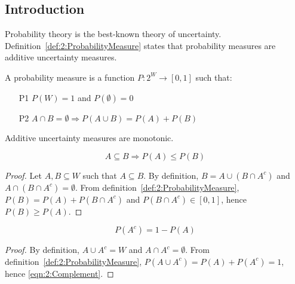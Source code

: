\subsection{Introduction}

Probability theory is the best-known theory of uncertainty.
Definition~\ref{def:2:ProbabilityMeasure} states that probability measures are
additive uncertainty measures.

\begin{dfn}
  \label{def:2:ProbabilityMeasure}

  A probability measure is a function $P : 2^W \to [0, 1]$ such that:
  \begin{enumerate}
    \item[P1] $P(W) = 1$ and $P(\emptyset) = 0$
    \item[P2] $A \cap B = \emptyset \Rightarrow P(A \cup B) = P(A) + P(B)$
  \end{enumerate}
\end{dfn}

Additive uncertainty measures are monotonic.

\begin{thm}[Monotonicity]
  \begin{equation}
    \label{eqn:2:Monotonicity}
    A \subseteq B \Rightarrow P(A) \leq P(B)
  \end{equation}
  \begin{proof}
    Let $A, B \subseteq W$ such that $A \subseteq B$.
    By definition, $B = A \cup(B \cap A^c)$ and $A \cap(B \cap A^c) = \emptyset$.
    From definition~\ref{def:2:ProbabilityMeasure}, $P(B) = P(A) + P(B \cap A^c)$
    and $P(B \cap A^c) \in [0, 1]$, hence $P(B) \geq P(A)$.
  \end{proof}
\end{thm}

\begin{thm}[Complement]
  \label{thm:2:Complement}
  \begin{equation}
    \label{eqn:2:Complement}
    P(A^c) = 1 - P(A)
  \end{equation}
  \begin{proof}
    By definition, $A \cup A^c = W$ and $A\cap A^c = \emptyset$.
    From definition~\ref{def:2:ProbabilityMeasure}, $P(A \cup A^c) = P(A) + P(A^c)
      = 1$, hence \ref{eqn:2:Complement}.
  \end{proof}
\end{thm}

